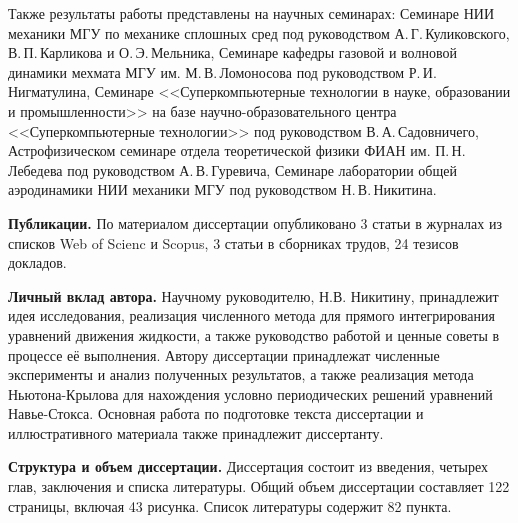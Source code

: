 Также результаты работы представлены на научных семинарах: 
Семинаре НИИ механики МГУ по механике сплошных сред под руководством А.\,Г.\,Куликовского, В.\,П.\,Карликова и О.\,Э.\,Мельника, 
Семинаре кафедры газовой и волновой динамики мехмата МГУ им. М.\,В.\,Ломоносова под руководством Р.\,И.\,Нигматулина,
Семинаре <<Суперкомпьютерные технологии в науке, образовании и промышленности>> на базе научно-образовательного центра <<Суперкомпьютерные технологии>> под руководством В.\,А.\,Садовничего,
Астрофизическом семинаре отдела теоретической физики ФИАН им. П.\,Н.\,Лебедева под руководством А.\,В.\,Гуревича,
Семинаре лаборатории общей аэродинамики НИИ механики МГУ под руководством Н.\,В.\,Никитина.



\textbf{Публикации.} 
По материалом диссертации опубликовано 3 статьи в журналах из списков Web of Scienc и Scopus, 
3 статьи в сборниках трудов, 
24 тезисов докладов.

{\bf Личный вклад автора.} 
Научному руководителю, Н.В. Никитину, принадлежит идея исследования, реализация численного метода для прямого интегрирования уравнений движения жидкости, а также руководство работой и ценные советы в процессе её выполнения. Автору диссертации принадлежат численные эксперименты и анализ полученных результатов, а также реализация метода Ньютона-Крылова для нахождения условно периодических решений уравнений Навье-Стокса. Основная работа по подготовке текста диссертации и иллюстративного материала также принадлежит диссертанту. 

{\bf Структура и объем диссертации.} 
Диссертация состоит из введения, четырех глав, заключения и списка литературы. Общий объем диссертации составляет 122 страницы, включая 43 рисунка. Список литературы содержит 82 пункта. 



